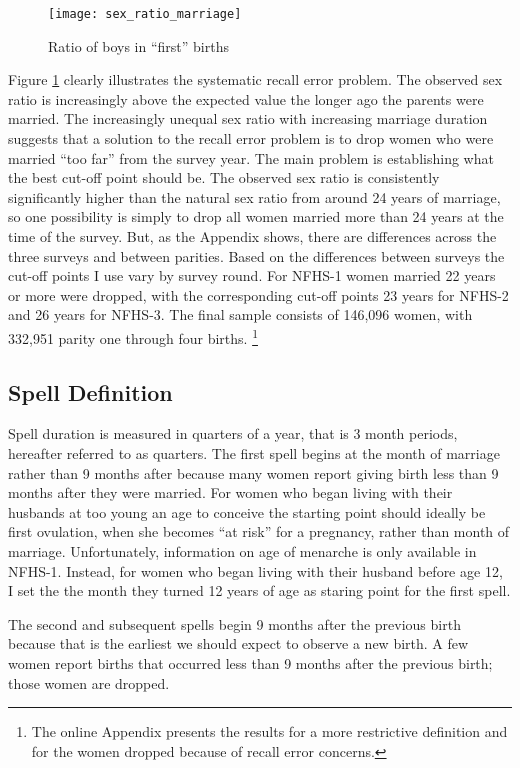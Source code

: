 \documentclass[12pt,letterpaper]{article}
\begin{document}
\begin{figure}[htp]%
\centering
\texttt{[image: sex\_ratio\_marriage]}
\caption{Ratio of boys in ``first'' births}
\label{fig:sexRatioMarriage}
\end{figure}


Figure \ref{fig:sexRatioMarriage} clearly illustrates the systematic recall error
problem.
The observed sex ratio is increasingly above the expected value the
longer ago the parents were married.
The increasingly unequal sex ratio with increasing marriage duration suggests that
a solution to the recall error problem is to drop women who were married ``too far'' from 
the survey year.
The main problem is establishing what the best cut-off point should be.
The observed sex ratio is consistently significantly higher than the natural sex ratio 
from around 24 years of marriage, so one possibility is simply to drop all women married 
more than 24 years at the time of the survey.
But, as the Appendix shows, there are differences across the three surveys and between 
parities.
Based on the differences between surveys the cut-off points I use vary by survey round.
For NFHS-1 women married 22 years or more were dropped, with the corresponding cut-off 
points 23 years for NFHS-2  and 26 years for NFHS-3.
The final sample consists of 146,096 women, with 332,951 parity one through four births.%
\footnote{
The online Appendix presents the results for a more restrictive definition and for the
women dropped because of recall error concerns.
}


\subsection{Spell Definition\label{sec:spell_def}}

Spell duration is measured in quarters of a year, that is 3 month periods, hereafter
referred to as quarters.
The first spell begins at the month of marriage rather than 9 months after because many 
women report giving birth less than 9 months after they were married.
For women who began living with their husbands at too young an age to conceive the 
starting point should ideally be first ovulation, when she becomes ``at risk'' for a 
pregnancy, rather than month of marriage.
Unfortunately, information on age of menarche is only available in NFHS-1.
Instead, for women who began living with their husband before age 12, I set the 
the month they turned 12 years of age as staring point for the first spell.

The second and subsequent spells begin 9 months after the previous birth 
because that is the earliest we should expect to observe a new birth.
A few women report births that occurred less than 9 months 
after the previous birth; those women are dropped.
\end{document}
